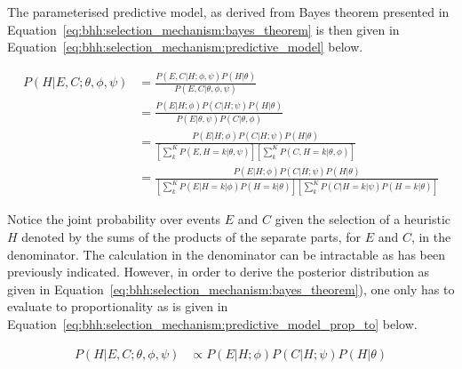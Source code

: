 The parameterised predictive model, as derived from Bayes theorem presented in Equation~\eqref{eq:bhh:selection_mechanism:bayes_theorem} is then given in Equation~\eqref{eq:bhh:selection_mechanism:predictive_model} below.

\begin{equation}
      \label{eq:bhh:selection_mechanism:predictive_model}
      \begin{split}
            P(H \vert E, C;  \theta, \phi, \psi)
            &= \frac{
                  P(E, C \vert H;  \phi, \psi)  P(H \vert \theta)
            }{
                  P(E, C \vert \theta, \phi, \psi)
            } \\
            &= \frac{
                  P(E \vert H;  \phi)  P(C \vert H;  \psi) P(H \vert \theta)
            }{
                  P(E \vert \theta, \psi) P(C \vert \theta, \phi)
            } \\
            &= \frac{
                  P(E \vert H;  \phi)  P(C \vert H;  \psi) P(H \vert \theta)
            }{
                  \left[ \sum_{k}^{K} P(E, H=k \vert \theta, \psi) \right] \left[ \sum_{k}^{K}  P(C, H=k \vert \theta, \phi) \right]
            } \\
            &= \frac{
                  P(E \vert H;  \phi)  P(C \vert H;  \psi) P(H \vert \theta)
            }{
                  \left[ \sum_{k}^{K} P(E \vert H=k \vert \phi) P(H=k \vert \theta) \right] \left[ \sum_{k}^{K} P(C \vert H=k \vert \psi) P(H=k \vert \theta) \right]
            }
      \end{split}
\end{equation}

Notice the joint probability over events $E$ and $C$ given the selection of a heuristic $H$ denoted by the sums of the products of the separate parts, for $E$ and $C$, in the denominator. The calculation in the denominator can be intractable as has been previously indicated. However, in order to derive the posterior distribution as given in Equation~\eqref{eq:bhh:selection_mechanism:bayes_theorem}), one only has to evaluate to proportionality as is given in Equation~\eqref{eq:bhh:selection_mechanism:predictive_model_prop_to} below.

\begin{equation}
      \label{eq:bhh:selection_mechanism:predictive_model_prop_to}
      \begin{split}
            P(H \vert E, C;  \theta, \phi, \psi) &\propto P(E \vert H;  \phi)  P(C \vert H;  \psi) P(H \vert \theta)
      \end{split}
\end{equation}

